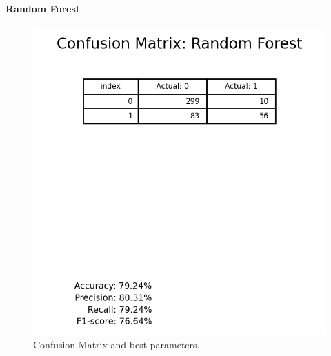             \paragraph{Random Forest}
                \begin{figure}[H]
                        \centering
                        \includegraphics[scale=1]{images/dm_confu_mat_rand_fore}
                        \caption{Confusion Matrix and best parameters.}
                        \label{fig:dm-random-forest}
                \end{figure}
